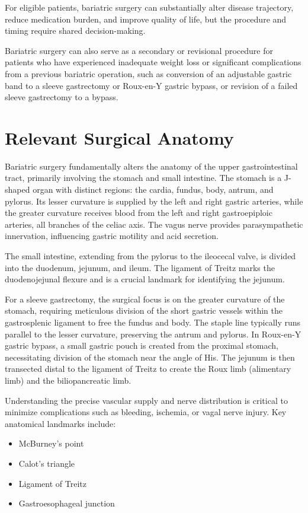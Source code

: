For eligible patients, bariatric surgery can substantially alter disease trajectory, reduce medication burden, and improve quality of life, but the procedure and timing require shared decision-making.

Bariatric surgery can also serve as a secondary or revisional procedure for patients who have experienced inadequate weight loss or significant complications from a previous bariatric operation, such as conversion of an adjustable gastric band to a sleeve gastrectomy or Roux-en-Y gastric bypass, or revision of a failed sleeve gastrectomy to a bypass.

\section*{Relevant Surgical Anatomy}
Bariatric surgery fundamentally alters the anatomy of the upper gastrointestinal tract, primarily involving the stomach and small intestine. The stomach is a J-shaped organ with distinct regions: the cardia, fundus, body, antrum, and pylorus. Its lesser curvature is supplied by the left and right gastric arteries, while the greater curvature receives blood from the left and right gastroepiploic arteries, all branches of the celiac axis. The vagus nerve provides parasympathetic innervation, influencing gastric motility and acid secretion. 

The small intestine, extending from the pylorus to the ileocecal valve, is divided into the duodenum, jejunum, and ileum. The ligament of Treitz marks the duodenojejunal flexure and is a crucial landmark for identifying the jejunum. 

For a sleeve gastrectomy, the surgical focus is on the greater curvature of the stomach, requiring meticulous division of the short gastric vessels within the gastrosplenic ligament to free the fundus and body. The staple line typically runs parallel to the lesser curvature, preserving the antrum and pylorus. In Roux-en-Y gastric bypass, a small gastric pouch is created from the proximal stomach, necessitating division of the stomach near the angle of His. The jejunum is then transected distal to the ligament of Treitz to create the Roux limb (alimentary limb) and the biliopancreatic limb. 

Understanding the precise vascular supply and nerve distribution is critical to minimize complications such as bleeding, ischemia, or vagal nerve injury. Key anatomical landmarks include:

\begin{itemize}
  \item McBurney's point
  \item Calot's triangle
  \item Ligament of Treitz
  \item Gastroesophageal junction
\end{itemize}

